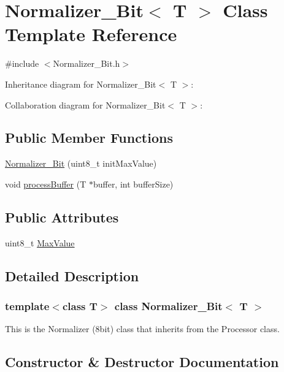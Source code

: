 \hypertarget{classNormalizer__8Bit}{}\section{Normalizer\+\_\+Bit$<$ T $>$ Class Template Reference}
\label{classNormalizer__8Bit}


{\ttfamily \#include $<$Normalizer\+\_\+Bit.\+h$>$}



Inheritance diagram for Normalizer\+\_\+Bit$<$ T $>$\+:


Collaboration diagram for Normalizer\+\_\+Bit$<$ T $>$\+:
\subsection*{Public Member Functions}
\begin{DoxyCompactItemize}
\item 
\hyperlink{classNormalizer__8Bit_a48ba910d0a37834c96241eb8fd3ddadd}{Normalizer\+\_\+Bit} (uint8\+\_\+t init\+Max\+Value)
\item 
void \hyperlink{classNormalizer__8Bit_aaadd6fc8065b38bd09021d9a6bf93c03}{process\+Buffer} (T $\ast$buffer, int buffer\+Size)
\end{DoxyCompactItemize}
\subsection*{Public Attributes}
\begin{DoxyCompactItemize}
\item 
uint8\+\_\+t \hyperlink{classNormalizer__8Bit_a1680eafc06ae62344d8968028e2b07c1}{Max\+Value}
\end{DoxyCompactItemize}


\subsection{Detailed Description}
\subsubsection*{template$<$class T$>$\newline
class Normalizer\+\_\+Bit$<$ T $>$}

This is the Normalizer (8bit) class that inherits from the Processor class. 

\subsection{Constructor \& Destructor Documentation}
\mbox{\label{classNormalizer__8Bit_a48ba910d0a37834c96241eb8fd3ddadd}} 
